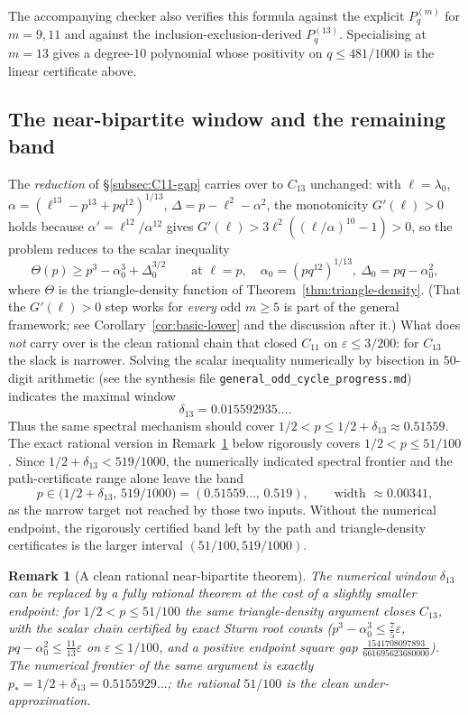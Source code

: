 \documentclass[11pt]{article}
\newtheorem{remark}[theorem]{Remark}
\newcommand{\eps}{\varepsilon}
\begin{document}
The accompanying checker also verifies this formula against the explicit $P_q^{(m)}$ for $m=9,11$ and against the inclusion-exclusion-derived $P_q^{(13)}$.  Specialising at $m=13$ gives a degree-$10$ polynomial whose positivity on $q\le481/1000$ is the linear certificate above.

\subsection{The near-bipartite window and the remaining band}\label{subsec:C13-gap}

The \emph{reduction} of \S\ref{subsec:C11-gap} carries over to $C_{13}$ unchanged: with $\ell=\lambda_0$, $\alpha=(\ell^{13}-p^{13}+pq^{12})^{1/13}$, $\Delta=p-\ell^2-\alpha^2$, the monotonicity $G'(\ell)>0$ holds because $\alpha'=\ell^{12}/\alpha^{12}$ gives $G'(\ell)>3\ell^2((\ell/\alpha)^{10}-1)>0$, so the problem reduces to the scalar inequality
\[
        \Theta(p)\ge p^3-\alpha_0^3+\Delta_0^{3/2}
        \qquad\text{at }\ell=p,\quad \alpha_0=(pq^{12})^{1/13},\ \Delta_0=pq-\alpha_0^2,
\]
where $\Theta$ is the triangle-density function of Theorem~\ref{thm:triangle-density}.  (That the $G'(\ell)>0$ step works for \emph{every} odd $m\ge5$ is part of the general framework; see Corollary~\ref{cor:basic-lower} and the discussion after it.)  What does \emph{not} carry over is the clean rational chain that closed $C_{11}$ on $\eps\le3/200$: for $C_{13}$ the slack is narrower.  Solving the scalar inequality numerically by bisection in $50$-digit arithmetic (see the synthesis file \texttt{general\_odd\_cycle\_progress.md}) indicates the maximal window
\[
        \delta_{13}=0.015592935\ldots .
\]
Thus the same spectral mechanism should cover $1/2<p\le1/2+\delta_{13}\approx0.51559$.
The exact rational version in Remark~\ref{rmk:C13-rational} below rigorously covers $1/2<p\le51/100$.  Since $1/2+\delta_{13}<519/1000$, the numerically indicated spectral frontier and the path-certificate range alone leave the band
\begin{equation}\label{eq:C13-residual}
        p\in\bigl(1/2+\delta_{13},\,519/1000\bigr)=(0.51559\ldots,\,0.519),
        \qquad\text{width }\approx0.00341,
\end{equation}
as the narrow target not reached by those two inputs.  Without the numerical endpoint, the rigorously certified band left by the path and triangle-density certificates is the larger interval $(51/100,519/1000)$.

\begin{remark}[A clean rational near-bipartite theorem]\label{rmk:C13-rational}
The numerical window $\delta_{13}$ can be replaced by a fully rational theorem at the cost of a slightly smaller endpoint: for $1/2<p\le 51/100$ the same triangle-density argument closes $C_{13}$, with the scalar chain certified by exact Sturm root counts ($p^3-\alpha_0^3\le\tfrac75\eps$, $pq-\alpha_0^2\le\tfrac{11}{13}\eps$ on $\eps\le1/100$, and a positive endpoint square gap $\tfrac{1541708097893}{661695623680000}$).  The numerical frontier of the \emph{same} argument is exactly $p_*=1/2+\delta_{13}=0.5155929\ldots$; the rational $51/100$ is the clean under-approximation.
\end{remark}
\end{document}
